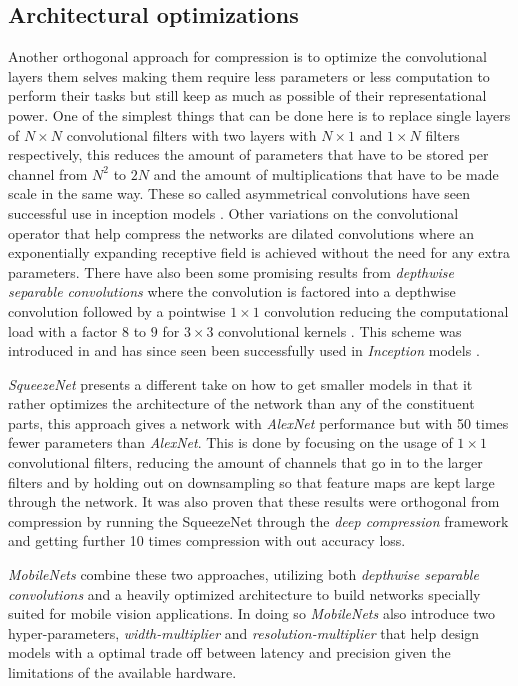 \documentclass{kththesis}
\newcommand{\bibentry}[1]{\parencite{#1}}
\begin{document}
\subsection{Architectural optimizations}
Another orthogonal approach for compression is to optimize the convolutional
layers them selves making them require less parameters or less computation to
perform their tasks but still keep as much as possible of their representational
power. One of the simplest things that can be done here is to replace single
layers of \(N \times N\) convolutional filters with two layers with \(N \times
1\) and \(1 \times N\) filters respectively, this reduces the amount of
parameters that have to be stored per channel from \(N^2\) to \(2N\) and the
amount of multiplications that have to be made scale in the same way. These
so called asymmetrical convolutions have seen successful use in inception models
\bibentry{szegedy2016rethinking}.  
Other variations on the convolutional operator that help compress the networks
are dilated convolutions \bibentry{yu2015multi} where an exponentially expanding
receptive field is achieved without the need for any extra parameters. There
have also been some promising results from \emph{depthwise separable
  convolutions} where the convolution is factored into a depthwise convolution
followed by a pointwise \(1 \times 1\) convolution reducing the computational
load with a factor \(8\) to \(9\) for \(3 \times 3\) convolutional kernels
\bibentry{howard2017mobilenets}. This scheme was introduced in
\bibentry{sifre2014rigid} and has since seen been successfully used in
\emph{Inception} models \bibentry{ioffe2015batch}.  

\emph{SqueezeNet} \bibentry{iandola2016squeezenet} presents a different take on
how to get smaller models in that it rather optimizes the architecture of the
network than any of the constituent parts, this approach gives a network with
\emph{AlexNet} performance but with 50 times fewer parameters than 
\emph{AlexNet}. This is done by focusing on the usage of \(1 \times 1\)
convolutional filters, reducing the amount of channels that go in to the larger
filters and by holding out on downsampling so that feature maps are kept large
through the network. It was also proven that these results were orthogonal from
compression by running the SqueezeNet through the \emph{deep compression}
framework \bibentry{han2015deep} and getting further 10 times compression with
out accuracy loss. 

\emph{MobileNets} \bibentry{howard2017mobilenets} combine these two approaches,
utilizing both \emph{depthwise separable convolutions} and a heavily optimized
architecture to build networks specially suited for mobile vision applications.
In doing so \emph{MobileNets} also introduce two hyper-parameters,
\emph{width-multiplier} and \emph{resolution-multiplier} that help design models
with a optimal trade off between latency and precision given the limitations of
the available hardware. 
\end{document}
